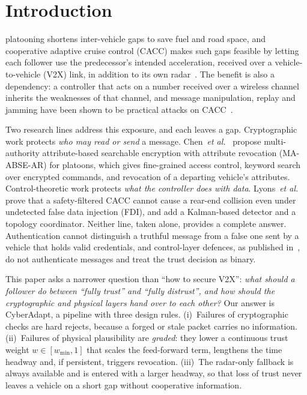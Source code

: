 \documentclass[journal]{IEEEtran}
\begin{document}
\section{Introduction}
 platooning shortens inter-vehicle gaps to save fuel and road space, and cooperative adaptive cruise control (CACC) makes such gaps feasible by letting each follower use the predecessor's intended acceleration, received over a vehicle-to-vehicle (V2X) link, in addition to its own radar~\cite{ploeg2014}. The benefit is also a dependency: a controller that acts on a number received over a wireless channel inherits the weaknesses of that channel, and message manipulation, replay and jamming have been shown to be practical attacks on CACC~\cite{heijden2017,amoozadeh2015}.

Two research lines address this exposure, and each leaves a gap. Cryptographic work protects \emph{who may read or send} a message. Chen~\emph{et al.}~\cite{chen2026} propose multi-authority attribute-based searchable encryption with attribute revocation (MA-ABSE-AR) for platoons, which gives fine-grained access control, keyword search over encrypted commands, and revocation of a departing vehicle's attributes. Control-theoretic work protects \emph{what the controller does with data}. Lyons~\emph{et al.}~\cite{lyons2026} prove that a safety-filtered CACC cannot cause a rear-end collision even under undetected false data injection (FDI), and add a Kalman-based detector and a topology coordinator. Neither line, taken alone, provides a complete answer. Authentication cannot distinguish a truthful message from a false one sent by a vehicle that holds valid credentials, and control-layer defences, as published in~\cite{lyons2026}, do not authenticate messages and treat the trust decision as binary.

This paper asks a narrower question than ``how to secure V2X'': \emph{what should a follower do between ``fully trust'' and ``fully distrust'', and how should the cryptographic and physical layers hand over to each other?} Our answer is CyberAdapt, a pipeline with three design rules. (i)~Failures of cryptographic checks are hard rejects, because a forged or stale packet carries no information. (ii)~Failures of physical plausibility are \emph{graded}: they lower a continuous trust weight $w\in[w_{\min},1]$ that scales the feed-forward term, lengthens the time headway and, if persistent, triggers revocation. (iii)~The radar-only fallback is always available and is entered with a larger headway, so that loss of trust never leaves a vehicle on a short gap without cooperative information.
\end{document}
